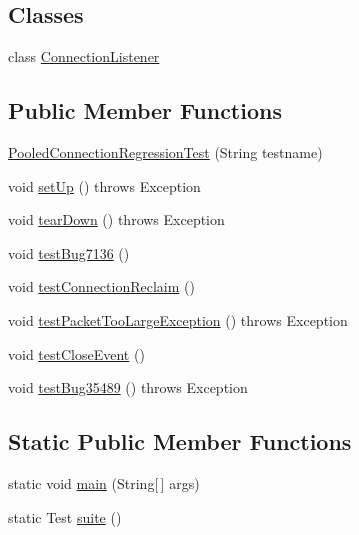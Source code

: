 \subsection*{Classes}
\begin{DoxyCompactItemize}
\item 
class \mbox{\hyperlink{classtestsuite_1_1regression_1_1_pooled_connection_regression_test_1_1_connection_listener}{Connection\+Listener}}
\end{DoxyCompactItemize}
\subsection*{Public Member Functions}
\begin{DoxyCompactItemize}
\item 
\mbox{\hyperlink{classtestsuite_1_1regression_1_1_pooled_connection_regression_test_a1be54941bd00006c4127b4eac74ea7e5}{Pooled\+Connection\+Regression\+Test}} (String testname)
\item 
void \mbox{\hyperlink{classtestsuite_1_1regression_1_1_pooled_connection_regression_test_a0c76c551e31c7968aa02015599380523}{set\+Up}} ()  throws Exception 
\item 
void \mbox{\hyperlink{classtestsuite_1_1regression_1_1_pooled_connection_regression_test_a7df03569e1b544c6d99eda49fe0fadc5}{tear\+Down}} ()  throws Exception 
\item 
void \mbox{\hyperlink{classtestsuite_1_1regression_1_1_pooled_connection_regression_test_a9eb614f168e80e2ea20ad3f5491eea9f}{test\+Bug7136}} ()
\item 
void \mbox{\hyperlink{classtestsuite_1_1regression_1_1_pooled_connection_regression_test_a1f5f8fe8cb25dbed85e0f3861c971e2f}{test\+Connection\+Reclaim}} ()
\item 
void \mbox{\hyperlink{classtestsuite_1_1regression_1_1_pooled_connection_regression_test_af108f826c529b646621b476cad0672d8}{test\+Packet\+Too\+Large\+Exception}} ()  throws Exception 
\item 
void \mbox{\hyperlink{classtestsuite_1_1regression_1_1_pooled_connection_regression_test_a271d5adc3f09f3483472dc3c7bb7f24b}{test\+Close\+Event}} ()
\item 
void \mbox{\hyperlink{classtestsuite_1_1regression_1_1_pooled_connection_regression_test_ae448a81e77d17829c9e922b7859ef609}{test\+Bug35489}} ()  throws Exception 
\end{DoxyCompactItemize}
\subsection*{Static Public Member Functions}
\begin{DoxyCompactItemize}
\item 
static void \mbox{\hyperlink{classtestsuite_1_1regression_1_1_pooled_connection_regression_test_a5c9f916248ffe26706b18f99e4f1246a}{main}} (String\mbox{[}$\,$\mbox{]} args)
\item 
static Test \mbox{\hyperlink{classtestsuite_1_1regression_1_1_pooled_connection_regression_test_ab5bce0e84e27d7745cb282860fe3297f}{suite}} ()
\end{DoxyCompactItemize}

